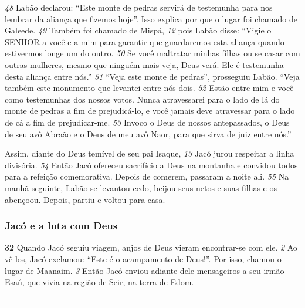 \bigskip  
\textit{\tiny 48}
Labão declarou: “Este monte de pedras servirá de testemunha para nos
lembrar da aliança que fizemos hoje”. Isso explica por que o lugar foi chamado de
Galeede. 
\textit{\tiny 49}
Também foi chamado de Mispá,
\textit{\tiny 12}
 pois Labão disse: “Vigie o SENHOR a
você e a mim para garantir que guardaremos esta aliança quando estivermos
longe um do outro. 
\textit{\tiny 50}
Se você maltratar minhas filhas ou se casar com outras
mulheres, mesmo que ninguém mais veja, Deus verá. Ele é testemunha desta
aliança entre nós.”
\textit{\tiny 51}
“Veja este monte de pedras”, prosseguiu Labão. “Veja também este
monumento que levantei entre nós dois. 
\textit{\tiny 52}
Estão entre mim e você como
testemunhas dos nossos votos. Nunca atravessarei para o lado de lá do monte de
pedras a fim de prejudicá-lo, e você jamais deve atravessar para o lado de cá a fim
de prejudicar-me. 
\textit{\tiny 53}
Invoco o Deus de nossos antepassados, o Deus de seu avô
Abraão e o Deus de meu avô Naor, para que sirva de juiz entre nós.”

\bigskip  
   Assim, diante do Deus temível de seu pai Isaque,
\textit{\tiny 13}
 Jacó jurou respeitar a linha
divisória. 
\textit{\tiny 54}
Então Jacó ofereceu sacrifício a Deus na montanha e convidou todos
para a refeição comemorativa. Depois de comerem, passaram a noite ali.
\textit{\tiny 55}
 Na manhã seguinte, Labão se levantou cedo, beijou seus netos e suas filhas
e os abençoou. Depois, partiu e voltou para casa.

\bigskip
\subsubsection*{Jacó e a luta com Deus}
\textbf{\large 32}
              Quando Jacó seguiu viagem, anjos de Deus vieram encontrar-se com
ele. 
\textit{\tiny 2} 
Ao vê-los, Jacó exclamou: “Este é o acampamento de Deus!”. Por isso, chamou
o lugar de Maanaim.
\textit{\tiny 3} 
Então Jacó enviou adiante dele mensageiros a seu irmão Esaú, que vivia na região
de Seir, na terra de Edom. 

----------------------------------------------------------------------
